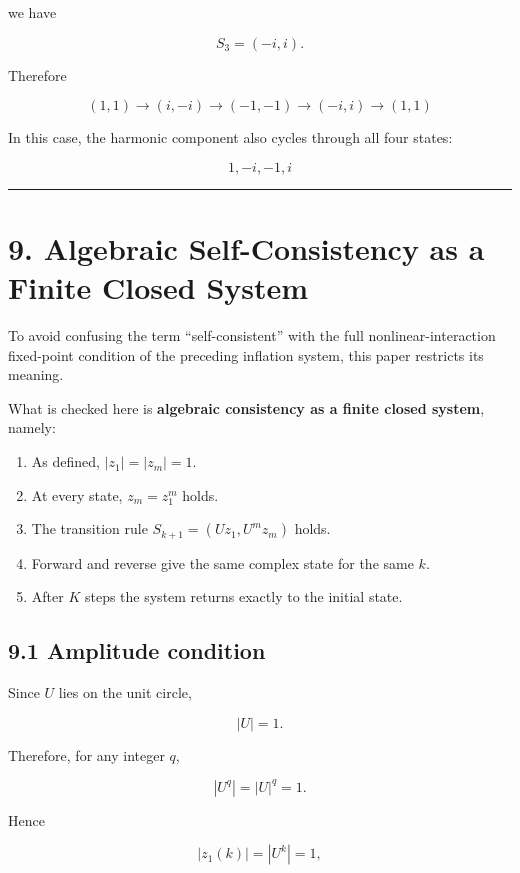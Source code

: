 \documentclass[
  a4paper,
]{article}
\providecommand{\tightlist}{%
  \setlength{\itemsep}{0pt}\setlength{\parskip}{0pt}}
\begin{document}
we have

\[
S_3
=
(-i,i).
\]

Therefore

\[
\boxed{
(1,1)
\to
(i,-i)
\to
(-1,-1)
\to
(-i,i)
\to
(1,1)
}
\]

In this case, the harmonic component also cycles through all four
states:

\[
1,-i,-1,i
\]

\begin{center}\rule{0.5\linewidth}{0.5pt}\end{center}

\section{9. Algebraic Self-Consistency as a Finite Closed
System}\label{algebraic-self-consistency-as-a-finite-closed-system}

To avoid confusing the term ``self-consistent'' with the full
nonlinear-interaction fixed-point condition of the preceding inflation
system, this paper restricts its meaning.

What is checked here is \textbf{algebraic consistency as a finite closed
system}, namely:

\begin{enumerate}
\def\labelenumi{\arabic{enumi}.}
\tightlist
\item
  As defined, \(|z_1|=|z_m|=1\).
\item
  At every state, \(z_m=z_1^m\) holds.
\item
  The transition rule \(S_{k+1}=(Uz_1,U^m z_m)\) holds.
\item
  Forward and reverse give the same complex state for the same \(k\).
\item
  After \(K\) steps the system returns exactly to the initial state.
\end{enumerate}

\subsection{9.1 Amplitude condition}\label{amplitude-condition}

Since \(U\) lies on the unit circle,

\[
|U|=1.
\]

Therefore, for any integer \(q\),

\[
|U^q|
=
|U|^q
=
1.
\]

Hence

\[
|z_1(k)|
=
|U^k|
=
1,
\]
\end{document}
